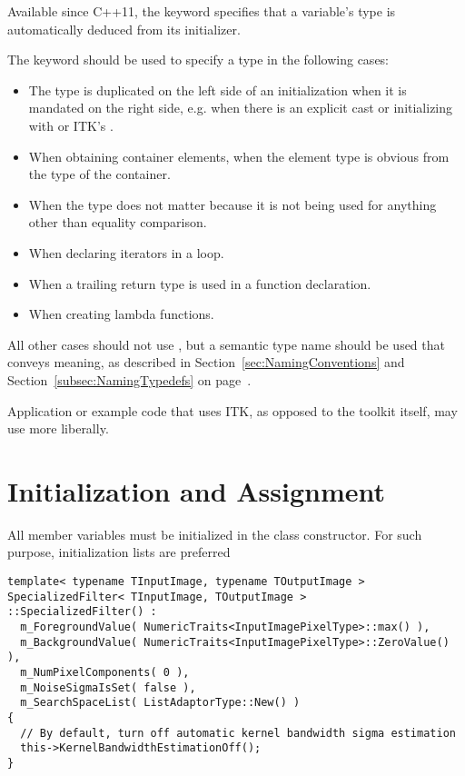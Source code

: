 Available since C++11, the  keyword specifies that a variable's type
is automatically deduced from its initializer.

The  keyword should be used to specify a type in the following cases:

\begin{itemize}
\item The type is duplicated on the left side of an initialization when it is mandated on the
	right side, e.g. when there is an explicit cast or initializing with  or ITK's .
\item When obtaining container elements, when the element type is obvious from the type
      of the container.
\item When the type does not matter because it is not being used for anything other
      than equality comparison.
\item When declaring iterators in a  loop.
\item When a trailing return type is used in a function declaration.
\item When creating lambda functions.
\end{itemize}

All other cases should not use , but a semantic type name
should be used that conveys meaning, as described in Section~\ref{sec:NamingConventions}
and Section~\ref{subsec:NamingTypedefs} on page~\pageref{subsec:NamingTypedefs}.

Application or example code that uses ITK, as opposed to the toolkit itself,
may use  more liberally.


\section{Initialization and Assignment}
\label{sec:IniitalizationAndAssignment}

All member variables must be initialized in the class constructor. For such
purpose, initialization lists are preferred

\small
\begin{verbatim}
template< typename TInputImage, typename TOutputImage >
SpecializedFilter< TInputImage, TOutputImage >
::SpecializedFilter() :
  m_ForegroundValue( NumericTraits<InputImagePixelType>::max() ),
  m_BackgroundValue( NumericTraits<InputImagePixelType>::ZeroValue() ),
  m_NumPixelComponents( 0 ),
  m_NoiseSigmaIsSet( false ),
  m_SearchSpaceList( ListAdaptorType::New() )
{
  // By default, turn off automatic kernel bandwidth sigma estimation
  this->KernelBandwidthEstimationOff();
}
\end{verbatim}
\normalsize

